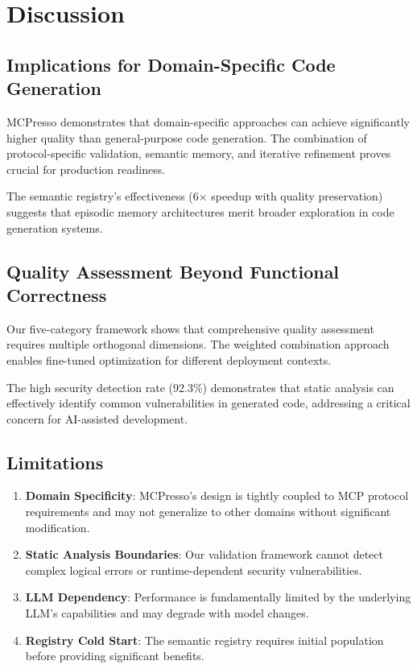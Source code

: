 \documentclass[10pt,twocolumn]{article}
\begin{document}
\section{Discussion}

\subsection{Implications for Domain-Specific Code Generation}

MCPresso demonstrates that domain-specific approaches can achieve significantly higher quality than general-purpose code generation. The combination of protocol-specific validation, semantic memory, and iterative refinement proves crucial for production readiness.

The semantic registry's effectiveness (6× speedup with quality preservation) suggests that episodic memory architectures merit broader exploration in code generation systems.

\subsection{Quality Assessment Beyond Functional Correctness}

Our five-category framework shows that comprehensive quality assessment requires multiple orthogonal dimensions. The weighted combination approach enables fine-tuned optimization for different deployment contexts.

The high security detection rate (92.3\%) demonstrates that static analysis can effectively identify common vulnerabilities in generated code, addressing a critical concern for AI-assisted development.

\subsection{Limitations}

\begin{enumerate}
\item \textbf{Domain Specificity}: MCPresso's design is tightly coupled to MCP protocol requirements and may not generalize to other domains without significant modification.

\item \textbf{Static Analysis Boundaries}: Our validation framework cannot detect complex logical errors or runtime-dependent security vulnerabilities.

\item \textbf{LLM Dependency}: Performance is fundamentally limited by the underlying LLM's capabilities and may degrade with model changes.

\item \textbf{Registry Cold Start}: The semantic registry requires initial population before providing significant benefits.
\end{enumerate}
\end{document}
